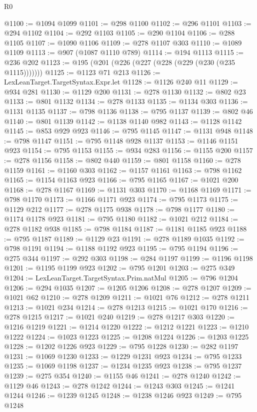 \begin{lexlean}{R0}
\begin{coremodule}
@1100 := @1094 @1099
@1101 := @298 @1100
@1102 := @296 @1101
@1103 := @294 @1102
@1104 := @292 @1103
@1105 := @290 @1104
@1106 := @288 @1105
@1107 := @1090 @1106
@1109 := @278 @1107 @303
@1110 := @1089 @1109
@1113 := @907 (@1087 @1110 @789)
@1114 := @194 @1113
@1115 := @236 @202
@1123 := @195 (@201 (@226 (@227 (@228 (@229 (@230 (@235 @1115)))))))
@1125 := @1123 @71 @213
@1126 := LexLeanTarget.TargetSyntax.Expr.let
@1128 := @1126 @240 @11
@1129 := @934 @281
@1130 := @1129 @200
@1131 := @278 @1130
@1132 := @802 @23
@1133 := @801 @1132
@1134 := @278 @1133
@1135 := @1134 @303
@1136 := @1131 @1135
@1137 := @798 @1136
@1138 := @795 @1137
@1139 := @802 @46
@1140 := @801 @1139
@1142 := @1138 @1140 @982
@1143 := @1128 @1142
@1145 := @853 @929 @923
@1146 := @795 @1145
@1147 := @1131 @948
@1148 := @798 @1147
@1151 := @795 @1148 @928 @1137
@1153 := @1146 @1151 @923
@1154 := @795 @1153
@1155 := @934 @283
@1156 := @1155 @200
@1157 := @278 @1156
@1158 := @802 @440
@1159 := @801 @1158
@1160 := @278 @1159
@1161 := @1160 @303
@1162 := @1157 @1161
@1163 := @798 @1162
@1165 := @1154 @1163 @923
@1166 := @795 @1165
@1167 := @1021 @200
@1168 := @278 @1167
@1169 := @1131 @303
@1170 := @1168 @1169
@1171 := @798 @1170
@1173 := @1166 @1171 @923
@1174 := @795 @1173
@1175 := @1129 @212
@1177 := @278 @1175 @938
@1178 := @798 @1177
@1180 := @1174 @1178 @923
@1181 := @795 @1180
@1182 := @1021 @212
@1184 := @278 @1182 @938
@1185 := @798 @1184
@1187 := @1181 @1185 @923
@1188 := @795 @1187
@1189 := @1129 @23
@1191 := @278 @1189 @1035
@1192 := @798 @1191
@1194 := @1188 @1192 @923
@1195 := @795 @1194
@1196 := @275 @344
@1197 := @292 @303
@1198 := @284 @1197
@1199 := @1196 @1198
@1201 := @1195 @1199 @923
@1202 := @795 @1201
@1203 := @275 @349
@1204 := LexLeanTarget.TargetSyntax.Prim.natMul
@1205 := @796 @1204
@1206 := @294 @1035
@1207 := @1205 @1206
@1208 := @278 @1207
@1209 := @1021 @62
@1210 := @278 @1209
@1211 := @1021 @76
@1212 := @278 @1211
@1213 := @1021 @234
@1214 := @278 @1213
@1215 := @1021 @170
@1216 := @278 @1215
@1217 := @1021 @240
@1219 := @278 @1217 @303
@1220 := @1216 @1219
@1221 := @1214 @1220
@1222 := @1212 @1221
@1223 := @1210 @1222
@1224 := @1023 @1223
@1225 := @1208 @1224
@1226 := @1203 @1225
@1228 := @1202 @1226 @923
@1229 := @795 @1228
@1230 := @282 @1197
@1231 := @1069 @1230
@1233 := @1229 @1231 @923
@1234 := @795 @1233
@1235 := @1069 @1198
@1237 := @1234 @1235 @923
@1238 := @795 @1237
@1239 := @275 @354
@1240 := @1155 @46
@1241 := @278 @1240
@1242 := @1129 @46
@1243 := @278 @1242
@1244 := @1243 @303
@1245 := @1241 @1244
@1246 := @1239 @1245
@1248 := @1238 @1246 @923
@1249 := @795 @1248

\end{coremodule}
\end{lexlean}
